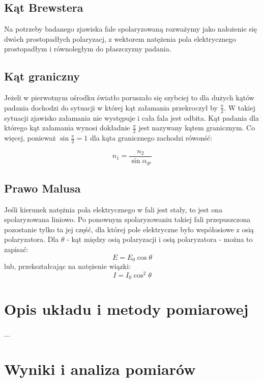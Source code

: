 \documentclass[a4paper,10pt]{article}
\begin{document}
\subsection{Kąt Brewstera}
Na potrzeby badanego zjawiska fale spolaryzowaną rozważymy jako nałożenie się dwóch prostopadłych polaryzacj, z wektorem
natężenia pola elektrycznego prostopadłym i równoległym do płaszczyzny padania.
\subsection{Kąt graniczny}
Jeżeli w pierwotnym ośrodku światło poruszało się szybciej to dla dużych kątów padania dochodzi do sytuacji
w której kąt załamania przekroczył by $\frac{\pi}{2}$. W takiej sytuacji zjawisko załamania nie występuje i cała fala jest odbita.
Kąt padania dla którego kąt załamania wynosi dokładnie $\frac{\pi}{2}$ jest nazywany kątem granicznym. Co więcej, ponieważ $\sin{\frac{\pi}{2}} = 1$
dla kąta granicznego zachodzi rówonść:

\begin{equation}
 n_1 = \frac{n_2}{\sin{\alpha_{gr}}}
\end{equation}
\subsection{Prawo Malusa}
Jeśli kierunek natężnia pola elektrycznego w fali jest stały, to jest ona spolaryzowana liniowo. Po ponownym spolaryzowaniu takiej fali
przepuszczona pozostanie tylko ta jej część, dla której pole elektryczne było współosiowe z osią polaryzatora. Dla $\theta$ - kąt między osią
polaryzacji i osią polaryzatora - można to zapisać:
\begin{equation}
  E = E_0 \cos{\theta}
\end{equation}
lub, przekształcając na natężenie wiązki:
\begin{equation}
  I=I_0 \cos^2{\theta}
\end{equation}


\section{Opis układu i metody pomiarowej}

\paragraph{}...

\section{Wyniki i analiza pomiarów}
\end{document}
